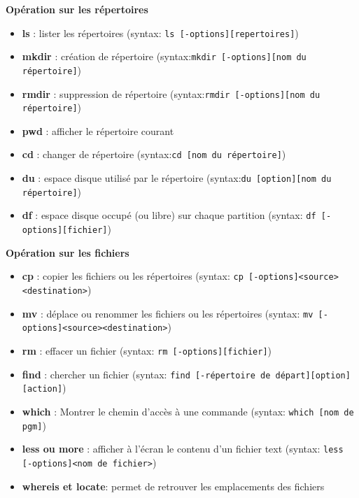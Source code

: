 \documentclass[french]{beamer}
\begin{document}
\begin{frame}
\textbf{Opération sur les répertoires}
    \begin{itemize}
    \item \textbf{ls} : lister les répertoires (syntax: \texttt{ls [-options][repertoires]})
    \item \textbf{mkdir} : création de répertoire (syntax:\texttt{mkdir [-options][nom du répertoire]})
    \item \textbf{rmdir} : suppression de répertoire (syntax:\texttt{rmdir [-options][nom du répertoire]})
    \item \textbf{pwd} : afficher le répertoire courant
    \item \textbf{cd} : changer de répertoire (syntax:\texttt{cd [nom du répertoire]})
    \item \textbf{du} : espace disque utilisé par le répertoire (syntax:\texttt{du [option][nom du répertoire]})
    \item \textbf{df} : espace disque occupé (ou libre) sur chaque partition (syntax: \texttt{df [-options][fichier]})
    \end{itemize}
\end{frame}

\begin{frame}
\textbf{Opération sur les fichiers}
    \begin{itemize}
    \item \textbf{cp} : copier les fichiers ou les répertoires (syntax: \texttt{cp [-options]<source><destination>})
    \item \textbf{mv} : déplace ou renommer les fichiers ou les répertoires (syntax: \texttt{mv [-options]<source><destination>})
    \item \textbf{rm} : effacer un fichier (syntax: \texttt{rm [-options][fichier]})
    \item \textbf{find} : chercher un fichier (syntax: \texttt{find [-répertoire de départ][option][action]})
    \item \textbf{which} : Montrer le chemin d'accès à une commande (syntax: \texttt{which [nom de pgm]})
    \item \textbf{less ou more} : afficher à l'écran le contenu d'un fichier text (syntax: \texttt{less [-options]<nom de fichier>})
    \item \textbf{whereis et locate}: permet de retrouver les emplacements des fichiers
    \end{itemize}
\end{frame}
\end{document}
